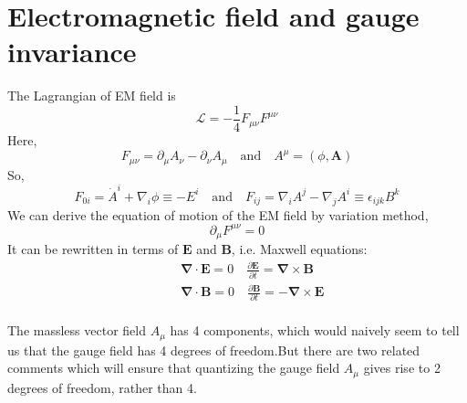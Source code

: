 \documentclass[cyan]{elegantnote}
\begin{document}
\section{Electromagnetic field and gauge invariance}
\noindent
The Lagrangian of EM field is
\[\mathcal{L} = -\frac{1}{4}F_{\mu\nu}F^{\mu\nu}\]
Here,
\[F_{\mu\nu} = \partial_{\mu} A_{\nu} - \partial_{\nu} A_{\mu} \quad \mbox{and} \quad A^{\mu} = (\phi,\bm{A})\]
So,
\[F_{0i} = \dot{A}^i + \nabla_i \phi \equiv -E^i \quad \mbox{and} \quad F_{ij} = \nabla_i A^j - \nabla_j A^i \equiv \epsilon_{ijk}B^k\]
We can derive the equation of motion of the EM field by variation method,
\[\partial_{\mu}F^{\mu \nu} = 0\]
It can be rewritten in terms of $\bm{E}$ and $\bm{B}$, i.e. Maxwell equations:
\begin{eqnarray}
&\phantom{=}&\bm{\nabla} \cdot \bm{E} = 0 \quad \frac{\partial \bm{E}}{\partial t} = \bm{\nabla} \times \bm{B} \nonumber \\
&\phantom{=}& \bm{\nabla} \cdot \bm{B} = 0  \quad \frac{\partial \bm{B}}{\partial t} = - \bm{\nabla} \times \bm{E}\nonumber
\end{eqnarray}
\\
The massless vector field $A_{\mu}$ has 4 components, which would naively seem to tell us that the gauge field has 4 degrees of freedom.But there are two related comments which will ensure that quantizing the gauge field $A_{\mu}$ gives rise to 2 degrees of freedom, rather than 4.
\end{document}
